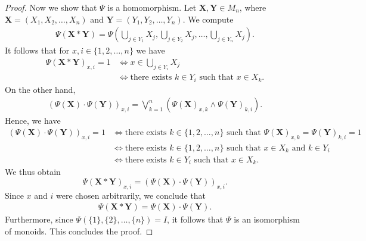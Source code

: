 \documentclass[10pt,a4paper]{amsart}
\begin{document}
\begin{proof}
   Now we show that $\Psi$ is a homomorphism. Let $\mathbf{X}, \mathbf{Y} \in M_n$, where
   $\mathbf{X} = (X_1, X_2, \dots, X_n)$ and $\mathbf{Y} = (Y_1, Y_2, \dots, Y_n)$. We compute
   \begin{align*}
      \Psi(\mathbf{X} \ast \mathbf{Y}) = \Psi(\bigcup_{j \in Y_1} X_j, \bigcup_{j \in Y_2} X_j, \dots, \bigcup_{j \in Y_n} X_j).
   \end{align*}
   It follows that for $x, i \in \{1, 2, \dots, n\}$ we have 
   \begin{align*}
      \Psi(\mathbf{X} \ast \mathbf{Y})_{x, i} = 1 &\Leftrightarrow x \in \bigcup_{j\in Y_i}X_j \\
      &\Leftrightarrow \text{there exists } k \in Y_i \text{ such that } x \in X_k.
   \end{align*}
   On the other hand,
   \begin{align*}
      (\Psi(\mathbf{X}) \cdot \Psi(\mathbf{Y}))_{x, i} = \bigvee_{k=1}^n (\Psi(\mathbf{X})_{x, k} \land \Psi(\mathbf{Y})_{k, i}).
   \end{align*}
   Hence, we have
   \begin{align*}
      (\Psi(\mathbf{X}) \cdot \Psi(\mathbf{Y}))_{x, i} = 1 &\Leftrightarrow \text{there exists } k \in \{1, 2, \dots, n\} \text{ such that } \Psi(\mathbf{X})_{x, k} = \Psi(\mathbf{Y})_{k, i} = 1 \\
      &\Leftrightarrow \text{there exists } k \in \{1, 2, \dots, n\} \text{ such that } x \in X_k \text{ and } k \in Y_i \\
      &\Leftrightarrow \text{there exists } k \in Y_i \text{ such that } x \in X_k.
   \end{align*}
   We thus obtain
   \[
      \Psi(\mathbf{X} \ast \mathbf{Y})_{x, i} = (\Psi(\mathbf{X}) \cdot \Psi(\mathbf{Y}))_{x, i}.
   \]
   Since $x$ and $i$ were chosen arbitrarily, we conclude that
   \begin{align*}
      \Psi(\mathbf{X} \ast \mathbf{Y}) = \Psi(\mathbf{X}) \cdot \Psi(\mathbf{Y}).
   \end{align*}
   Furthermore, since $\Psi(\{1\}, \{2\}, \dots, \{n\}) = I$, it follows that $\Psi$ is an isomorphism of monoids. This concludes the proof.

\end{proof}
\end{document}

